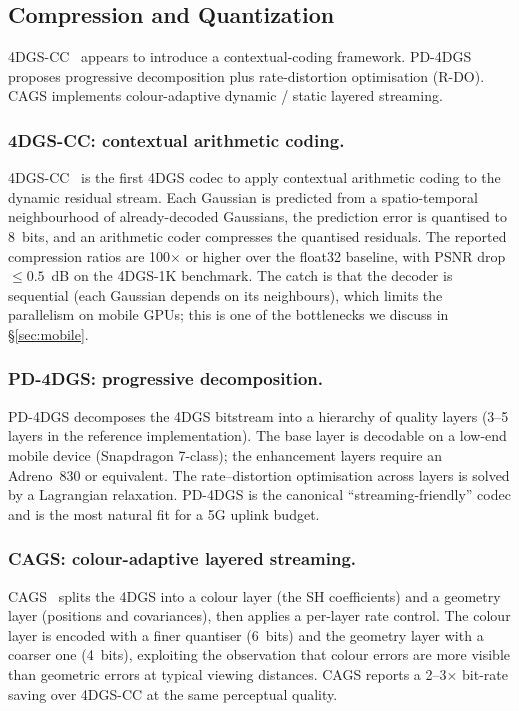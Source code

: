 \subsection{Compression and Quantization}
4DGS-CC~\cite{chen20254dgscc} appears to introduce a contextual-coding
framework. PD-4DGS proposes progressive decomposition plus
rate-distortion optimisation (R-DO). CAGS implements colour-adaptive
dynamic / static layered streaming.

\subsubsection{4DGS-CC: contextual arithmetic coding.}
4DGS-CC~\cite{chen20254dgscc} is the first 4DGS codec to apply
contextual arithmetic coding to the dynamic residual stream.
Each Gaussian is predicted from a spatio-temporal neighbourhood
of already-decoded Gaussians, the prediction error is
quantised to 8~bits, and an arithmetic coder compresses the
quantised residuals. The reported compression ratios are 100$\times$
or higher over the float32 baseline, with PSNR drop $\le 0.5$~dB
on the 4DGS-1K benchmark. The catch is that the decoder is
sequential (each Gaussian depends on its neighbours), which
limits the parallelism on mobile GPUs; this is one of the
bottlenecks we discuss in \S\ref{sec:mobile}.

\subsubsection{PD-4DGS: progressive decomposition.}
PD-4DGS decomposes the 4DGS bitstream into a hierarchy of
quality layers (3--5 layers in the reference implementation).
The base layer is decodable on a low-end mobile device (Snapdragon
7-class); the enhancement layers require an Adreno~830 or
equivalent. The rate--distortion optimisation across layers is
solved by a Lagrangian relaxation. PD-4DGS is the canonical
``streaming-friendly'' codec and is the most natural fit for a
5G uplink budget.

\subsubsection{CAGS: colour-adaptive layered streaming.}
CAGS~\cite{yin2026cags} splits the 4DGS into a colour layer
(the SH coefficients) and a geometry layer (positions and
covariances), then applies a per-layer rate control. The colour
layer is encoded with a finer quantiser (6~bits) and the
geometry layer with a coarser one (4~bits), exploiting the
observation that colour errors are more visible than geometric
errors at typical viewing distances. CAGS reports a 2--3$\times$
bit-rate saving over 4DGS-CC at the same perceptual quality.

